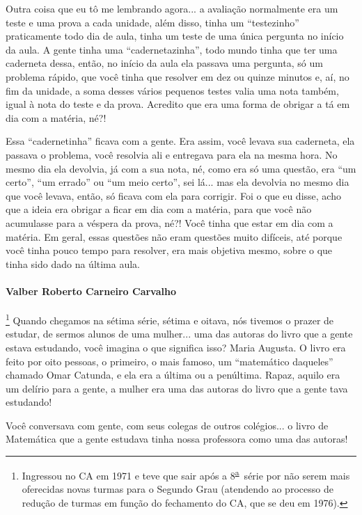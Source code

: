 \documentclass{hipatia}
\newcommand{\superau}{\textsuperscript{\underline{a}}~}
\begin{document}
Outra coisa que eu tô me lembrando agora... a avaliação normalmente era
um teste e uma prova a cada unidade, além disso, tinha um ``testezinho''
praticamente todo dia de aula, tinha um teste de uma única pergunta no
início da aula. A gente tinha uma ``cadernetazinha'', todo mundo tinha que
ter uma caderneta dessa, então, no início da aula ela passava uma
pergunta, só um problema rápido, que você tinha que resolver em dez ou
quinze minutos e, aí, no fim da unidade, a soma desses vários pequenos
testes valia uma nota também, igual à nota do teste e da prova. Acredito
que era uma forma de obrigar a tá em dia com a matéria, né?!

Essa ``cadernetinha'' ficava com a gente. Era assim, você levava sua
caderneta, ela passava o problema, você resolvia ali e entregava para
ela na mesma hora. No mesmo dia ela devolvia, já com a sua nota, né,
como era só uma questão, era ``um certo'', ``um errado'' ou ``um meio
certo'', sei lá... mas ela devolvia no mesmo dia que você levava, então,
só ficava com ela para corrigir. Foi o que eu disse, acho que a ideia
era obrigar a ficar em dia com a matéria, para que você não acumulasse
para a véspera da prova, né?! Você tinha que estar em dia com a matéria.
Em geral, essas questões não eram questões muito difíceis, até porque
você tinha pouco tempo para resolver, era mais objetiva mesmo, sobre o
que tinha sido dado na última aula.

\paragraph{Valber Roberto Carneiro Carvalho}\footnote{Ingressou no CA em
  1971 e teve que sair após a 8\superau  série por não serem mais oferecidas
  novas turmas para o Segundo Grau (atendendo ao processo de redução de
  turmas em função do fechamento do CA, que se deu em 1976).}
Quando chegamos na sétima série, sétima e oitava, nós tivemos o prazer
de estudar, de sermos alunos de uma mulher... uma das autoras do livro
que a gente estava estudando, você imagina o que significa isso? Maria
Augusta. O livro era feito por oito pessoas, o primeiro, o mais famoso,
um ``matemático daqueles'' chamado Omar Catunda, e ela era a última ou a
penúltima. Rapaz, aquilo era um delírio para a gente, a mulher era uma das
autoras do livro que a gente tava estudando!

Você conversava com gente, com seus colegas de outros colégios... o
livro de Matemática que a gente estudava tinha nossa professora como uma
das autoras!
\end{document}
